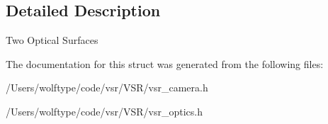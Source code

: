 \subsection{Detailed Description}
Two Optical Surfaces 

The documentation for this struct was generated from the following files\-:\begin{DoxyCompactItemize}
\item 
/\-Users/wolftype/code/vsr/\-V\-S\-R/vsr\-\_\-camera.\-h\item 
/\-Users/wolftype/code/vsr/\-V\-S\-R/vsr\-\_\-optics.\-h\end{DoxyCompactItemize}
